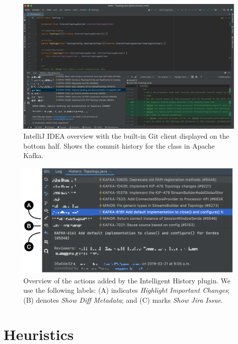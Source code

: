 \begin{figure}
    \includegraphics[width=\textwidth]{./images/intellij-overview.png}
    \caption{
        IntelliJ IDEA overview with the built-in Git client displayed on the bottom half. Shows the commit history for the  class in Apache Kafka.
    }
    \label{fig:IntelliJ-Overview}
\end{figure}

\begin{figure}
    \includegraphics[width=\textwidth]{./images/intelligent-history-overview.png}
    \caption{
        Overview of the actions added by the Intelligent History plugin. We use the following labels: (A) indicates \textit{Highlight Important Changes}; (B) denotes \textit{Show Diff Metadata}; and (C) marks \textit{Show Jira Issue}.
    }
    \label{fig:Intelligent-History-Overview}
\end{figure}

\section{Heuristics}
\label{sec:Heuristics}

